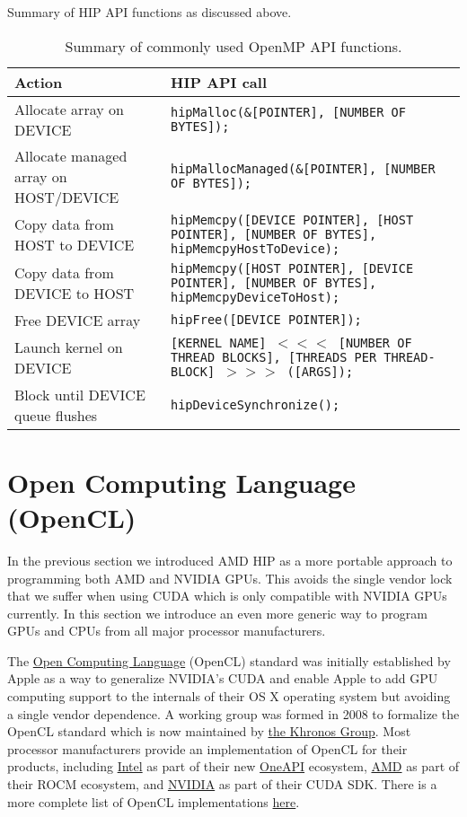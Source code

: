 Summary of HIP API functions as discussed above.
\begin{table}[htbp!]
    \centering
    \begin{tabular}{p{2in}|p{4in}} \hline
      Action & HIP API call\\ \hline
      Allocate array on DEVICE & \texttt{hipMalloc(\&[POINTER], [NUMBER OF BYTES]);} \\
      Allocate managed array on HOST/DEVICE &  \texttt{hipMallocManaged(\&[POINTER], [NUMBER OF BYTES]);} \\ \hline
      Copy data from HOST to DEVICE & \texttt{hipMemcpy([DEVICE POINTER], [HOST POINTER], [NUMBER OF BYTES], hipMemcpyHostToDevice);} \\
      Copy data from DEVICE to HOST & \texttt{hipMemcpy([HOST POINTER], [DEVICE POINTER], [NUMBER OF BYTES], hipMemcpyDeviceToHost);} \\ 
      Free DEVICE array & \texttt{hipFree([DEVICE POINTER]);} \\ \hline
      Launch kernel on DEVICE & \texttt{[KERNEL NAME] $<<<$ [NUMBER OF THREAD BLOCKS], [THREADS PER THREAD-BLOCK] $>>>$ ([ARGS]);} \\
      Block until DEVICE queue flushes & \texttt{hipDeviceSynchronize();} \\
    \hline\end{tabular}
    \caption{Summary of commonly used OpenMP API functions.}
    \label{ompDirectives.tab}
\end{table}


\newpage
\section{Open Computing Language (OpenCL)}

In the previous section we introduced AMD HIP as a more portable approach to programming both AMD and NVIDIA GPUs. This avoids the single vendor lock  that we suffer when using CUDA which is only compatible with NVIDIA GPUs currently. In this section we introduce an even more generic way to program GPUs and CPUs from all major processor manufacturers. 

The \href{https://en.wikipedia.org/wiki/OpenCL}{Open Computing Language} (OpenCL) standard was initially established by Apple as a way to generalize NVIDIA's CUDA and enable Apple to add GPU computing support to the internals of their OS X operating system but avoiding a single vendor dependence. A working group was formed in 2008 to formalize the OpenCL standard which is now maintained by \href{https://www.khronos.org/opencl/}{the Khronos Group}. Most processor manufacturers provide an implementation of OpenCL for their products, including \href{https://software.intel.com/en-us/articles/opencl-drivers}{Intel} as part of their new \href{https://software.intel.com/en-us/oneapi}{OneAPI} ecosystem, \href{https://rocm.github.io/QuickStartOCL.html}{AMD} as part of their ROCM ecosystem, and  \href{https://developer.nvidia.com/opencl}{NVIDIA} as part of their CUDA SDK. There is a more complete list of OpenCL implementations \href{https://www.khronos.org/opencl/resources}{here}.

